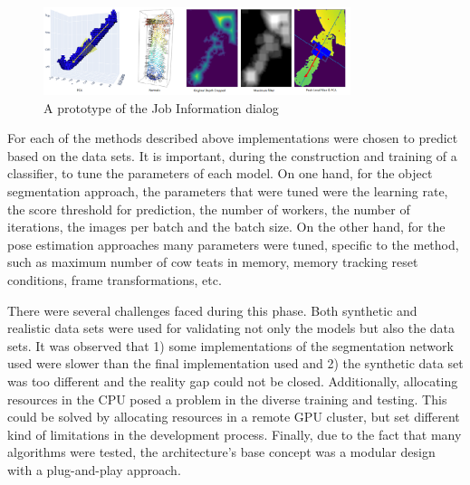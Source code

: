 \begin{figure}[!ht]
        \centering
        \includegraphics[width=0.8\textwidth]{images/cow_pose_methods.png}
        \caption{A prototype of the Job Information dialog}
        \label{fig:cow_fmc}
    \end{figure}
For each of the methods described above implementations were chosen to predict based on the data sets.  It is important, during the construction and training of a classifier, to tune the parameters of each model. On one hand, for the object segmentation approach, the parameters that were tuned were the learning rate, the score threshold for prediction, the number of workers, the number of iterations, the images per batch and the batch size. On the other hand, for the pose estimation approaches many parameters were tuned, specific to the method, such as maximum number of cow teats in memory, memory tracking reset conditions, frame transformations, etc.

There were several challenges faced during this phase. Both synthetic and realistic data sets were used for validating not only the models but also the data sets. It was observed that 1) some implementations of the segmentation network used were slower than the final implementation used and 2) the synthetic data set was too different and the reality gap could not be closed. Additionally, allocating resources in the CPU posed a problem in the diverse training and testing. This could be solved by allocating resources in a remote GPU cluster, but set different kind of limitations in the development process.  Finally, due to the fact that many algorithms were tested, the architecture's base concept was a modular design with a plug-and-play approach.

